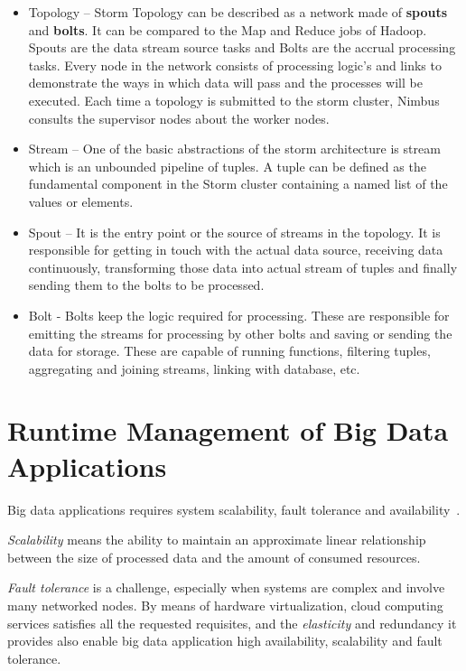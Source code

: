 \begin{itemize}
	\item Topology – Storm Topology can be described as a network made of \textbf{spouts} and \textbf{bolts}. It can be compared to the Map and Reduce jobs of Hadoop. Spouts are the data stream source tasks and Bolts are the accrual processing tasks. Every node in the network consists of processing logic’s and links to demonstrate the ways in which data will pass and the processes will be executed. Each time a topology is submitted to the storm cluster, Nimbus consults the supervisor nodes about the worker nodes. 
	\item Stream – One of the basic abstractions of the storm architecture is stream which is an unbounded pipeline of tuples. A tuple can be defined as the fundamental component in the Storm cluster containing a named list of the values or elements.  
	\item Spout – It is the entry point or the source of streams in the topology. It is responsible for getting in touch with the actual data source, receiving data continuously, transforming those data into actual stream of tuples and finally sending them to the bolts to be processed.
	\item Bolt - Bolts keep the logic required for processing. These are responsible for emitting the streams for processing by other bolts and saving or sending the data for storage. These are capable of running functions, filtering tuples, aggregating and joining streams, linking with database, etc.
\end{itemize}

\section{Runtime Management of Big Data Applications}\label{sec:runtime_mgmt_big_data_apps}
Big data applications requires system scalability, fault tolerance and  availability~\cite{articleBigData:2017}. 

\textit{Scalability} means the ability to maintain an approximate linear relationship between the size of processed data and the amount of consumed resources. 

\textit{Fault tolerance} is a challenge, especially when systems are complex and involve many networked nodes. By means of hardware virtualization, cloud computing services satisfies all the requested requisites, and the \textit{elasticity} and redundancy it provides  also enable big data application high availability, scalability and fault tolerance.

